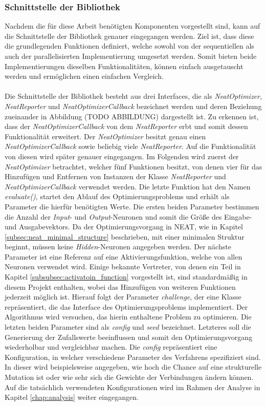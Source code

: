 \subsubsection{Schnittstelle der Bibliothek}
\label{subsubsec:library_interface}
Nachdem die für diese Arbeit benötigten Komponenten vorgestellt sind, kann auf die Schnittstelle der Bibliothek genauer eingegangen werden. Ziel ist, dass diese die grundlegenden Funktionen definiert, welche sowohl von der sequentiellen als auch der parallelisierten Implementierung umgesetzt werden. Somit bieten beide Implementierungen dieselben Funktionalitäten, können einfach ausgetauscht werden und ermöglichen einen einfachen Vergleich. 
\\\\
Die Schnittstelle der Bibliothek besteht aus drei Interfaces, die als \emph{NeatOptimizer}, \emph{NeatReporter} und \emph{NeatOptimizerCallback} bezeichnet werden und deren Beziehung zueinander in Abbildung (TODO ABBILDUNG) dargestellt ist. Zu erkennen ist, dass der \emph{NeatOptimizerCallback} von dem \emph{NeatReporter} erbt und somit dessen Funktionalität erweitert. Der \emph{NeatOptimizer} besitzt genau einen \emph{NeatOptimizerCallback} sowie beliebig viele \emph{NeatReporter}. Auf die Funktionalität von diesen wird später genauer eingegangen. Im Folgenden wird zuerst der \emph{NeatOptimizer} betrachtet, welcher fünf Funktionen besitzt, von denen vier für das Hinzufügen und Entfernen von Instanzen der Klasse \emph{NeatReporter} und \emph{NeatOptimizerCallback} verwendet werden. Die letzte Funktion hat den Namen \emph{evaluate()}, startet den Ablauf des Optimierungsproblems und erhält als Parameter die hierfür benötigten Werte. Die ersten beiden Parameter bestimmen die Anzahl der \emph{Input}- und \emph{Output}-Neuronen und somit die Größe des Eingabe- und Ausgabevektors. Da der Optimierungsvorgang in \ac{NEAT}, wie in Kapitel \ref{subsec:neat_minimal_structure}  beschrieben, mit einer minimalen Struktur beginnt, müssen keine \emph{Hidden}-Neuronen angegeben werden. Der nächste Parameter ist eine Referenz auf eine Aktivierungsfunktion, welche von allen Neuronen verwendet wird. Einige bekannte Vertreter, von denen ein Teil in Kapitel \ref{subsubsec:activatoin_function} vorgestellt ist, sind standardmäßig in diesem Projekt enthalten, wobei das Hinzufügen von weiteren Funktionen jederzeit möglich ist. Hierauf folgt der Parameter \emph{challenge}, der eine Klasse repräsentiert, die das Interface des Optimierungsproblems implementiert. Der Algorithmus wird versuchen, das hierin enthaltene Problem zu optimieren. Die letzten beiden Parameter sind als \emph{config} und \emph{seed} bezeichnet. Letzteres soll die Generierung der Zufallswerte beeinflussen und somit den Optimierungsvorgang wiederholbar und vergleichbar machen. Die \emph{config} repräsentiert eine Konfiguration, in welcher verschiedene Parameter des Verfahrens spezifiziert sind. In dieser wird beispielsweise angegeben, wie hoch die Chance auf eine strukturelle Mutation ist oder wie sehr sich die Gewichte der Verbindungen ändern können. Auf die tatsächlich verwendeten Konfigurationen wird im Rahmen der Analyse in Kapitel \ref{chap:analysis} weiter eingegangen.
